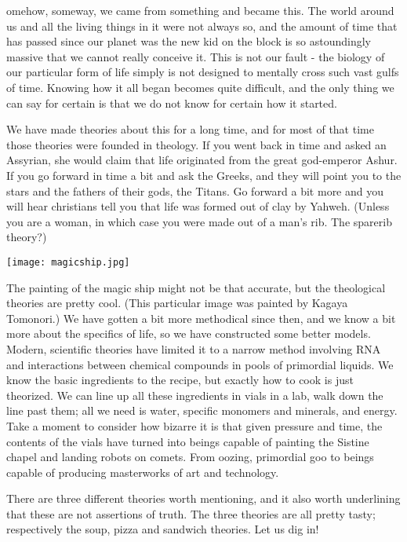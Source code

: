 omehow, someway, we came from something and became this.
The world around us and all the living things in it were not always so, and the amount of time that has passed since our planet was the new kid on the block is so astoundingly massive that we cannot really conceive it.
This is not our fault - the biology of our particular form of life simply is not designed to mentally cross such vast gulfs of time.
Knowing how it all began becomes quite difficult, and the only thing we can say for certain is that we do not know for certain how it started.

We have made theories about this for a long time, and for most of that time those theories were founded in theology.
If you went back in time and asked an Assyrian, she would claim that life originated from the great god-emperor Ashur.
If you go forward in time a bit and ask the Greeks, and they will point you to the stars and the fathers of their gods, the Titans.
Go forward a bit more and you will hear christians tell you that life was formed out of clay by Yahweh.
(Unless you are a woman, in which case you were made out of a man’s rib.
The sparerib theory?) 

\begin{center}
	\texttt{[image: magicship.jpg]}
\end{center}

The painting of the magic ship might not be that accurate, but the theological theories are pretty cool.
(This particular image was painted by Kagaya Tomonori.)
We have gotten a bit more methodical since then, and we know a bit more about the specifics of life, so we have constructed some better models.
Modern, scientific theories have limited it to a narrow method involving RNA and interactions between chemical compounds in pools of primordial liquids.
We know the basic ingredients to the recipe, but exactly how to cook is just theorized.
We can line up all these ingredients in vials in a lab, walk down the line past them; all we need is water, specific monomers and minerals, and energy.
Take a moment to consider how bizarre it is that given pressure and time, the contents of the vials have turned into beings capable of painting the Sistine chapel and landing robots on comets.
From oozing, primordial goo to beings capable of producing masterworks of art and technology.

There are three different theories worth mentioning, and it also worth underlining that these are not assertions of truth.
The three theories are all pretty tasty; respectively the soup, pizza and sandwich theories.
Let us dig in!

